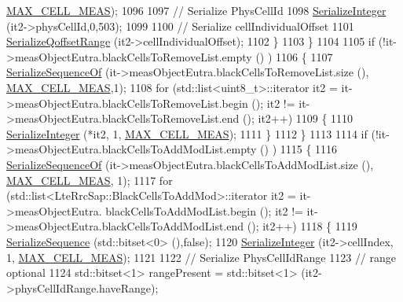 \begin{DoxyCode}
      \hyperlink{lte-rrc-header_8cc_a1d57dacc17deb664f3250c8c9bc5ba0e}{MAX\_CELL\_MEAS});
1096 
1097                   \textcolor{comment}{// Serialize PhysCellId}
1098                   \hyperlink{classns3_1_1Asn1Header_ab1c3bd37730affa7473bc759d625c29a}{SerializeInteger} (it2->physCellId,0,503);
1099 
1100                   \textcolor{comment}{// Serialize cellIndividualOffset}
1101                   \hyperlink{classns3_1_1RrcAsn1Header_ad1eb030398d2d91bce3493e8268a3e50}{SerializeQoffsetRange} (it2->cellIndividualOffset);
1102                 \}
1103             \}
1104 
1105           \textcolor{keywordflow}{if} (!it->measObjectEutra.blackCellsToRemoveList.empty () )
1106             \{
1107               \hyperlink{classns3_1_1Asn1Header_a066b6dd077bde6b0c243f3eda2621277}{SerializeSequenceOf} (it->measObjectEutra.blackCellsToRemoveList.size (),
      \hyperlink{lte-rrc-header_8cc_a1d57dacc17deb664f3250c8c9bc5ba0e}{MAX\_CELL\_MEAS},1);
1108               \textcolor{keywordflow}{for} (std::list<uint8\_t>::iterator it2 = it->measObjectEutra.blackCellsToRemoveList.begin (); 
      it2 != it->measObjectEutra.blackCellsToRemoveList.end (); it2++)
1109                 \{
1110                   \hyperlink{classns3_1_1Asn1Header_ab1c3bd37730affa7473bc759d625c29a}{SerializeInteger} (*it2, 1, \hyperlink{lte-rrc-header_8cc_a1d57dacc17deb664f3250c8c9bc5ba0e}{MAX\_CELL\_MEAS});
1111                 \}
1112             \}
1113 
1114           \textcolor{keywordflow}{if} (!it->measObjectEutra.blackCellsToAddModList.empty () )
1115             \{
1116               \hyperlink{classns3_1_1Asn1Header_a066b6dd077bde6b0c243f3eda2621277}{SerializeSequenceOf} (it->measObjectEutra.blackCellsToAddModList.size (), 
      \hyperlink{lte-rrc-header_8cc_a1d57dacc17deb664f3250c8c9bc5ba0e}{MAX\_CELL\_MEAS}, 1);
1117               \textcolor{keywordflow}{for} (std::list<LteRrcSap::BlackCellsToAddMod>::iterator it2 = it->measObjectEutra.
      blackCellsToAddModList.begin (); it2 != it->measObjectEutra.blackCellsToAddModList.end (); it2++)
1118                 \{
1119                   \hyperlink{classns3_1_1Asn1Header_aa9744858380443ed95836fed08799aed}{SerializeSequence} (std::bitset<0> (),\textcolor{keyword}{false});
1120                   \hyperlink{classns3_1_1Asn1Header_ab1c3bd37730affa7473bc759d625c29a}{SerializeInteger} (it2->cellIndex, 1, 
      \hyperlink{lte-rrc-header_8cc_a1d57dacc17deb664f3250c8c9bc5ba0e}{MAX\_CELL\_MEAS});
1121 
1122                   \textcolor{comment}{// Serialize PhysCellIdRange}
1123                   \textcolor{comment}{// range optional}
1124                   std::bitset<1> rangePresent = std::bitset<1> (it2->physCellIdRange.haveRange);

\end{DoxyCode}
